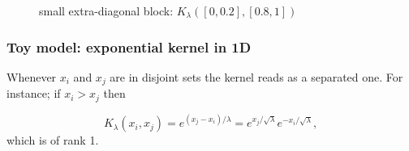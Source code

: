 \begin{frame}
{\begin{figure}
\caption{small extra-diagonal block: $K_{\lambda}([0,0.2],[0.8,1])$ }
\end{figure}
}
\end{frame}

\begin{frame}
\frametitle{Toy model: exponential kernel in 1D}
Whenever $x_i$ and $x_j$ are in disjoint sets the kernel reads as a separated one. For instance; if $x_i > x_j$ then 

\[ K_{\lambda}(x_i,x_j) = e^{(x_j-x_i)/\lambda} = e^{x_j/\sqrt{\lambda}}e^{-x_i/\sqrt{\lambda}} , 
\]
which is of rank 1.
\end{frame}

